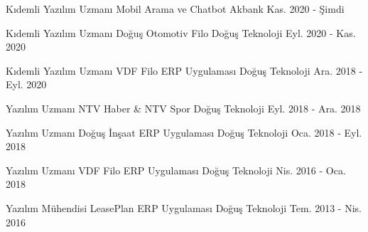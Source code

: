

\begin{cventries}

  \cventry
    {Kıdemli Yazılım Uzmanı} %
    {Mobil Arama ve Chatbot} %
    {Akbank} %
    {Kas. 2020 - Şimdi} %
    {}

  \cventry
    {Kıdemli Yazılım Uzmanı} %
    {Doğuş Otomotiv Filo} %
    {Doğuş Teknoloji} %
    {Eyl. 2020 - Kas. 2020} %
    {}

  \cventry
    {Kıdemli Yazılım Uzmanı} %
    {VDF Filo ERP Uygulaması} %
    {Doğuş Teknoloji} %
    {Ara. 2018 - Eyl. 2020} %
    {}

  \cventry
    {Yazılım Uzmanı} %
    {NTV Haber \& NTV Spor} %
    {Doğuş Teknoloji} %
    {Eyl. 2018 - Ara. 2018} %
    {}

  \cventry
    {Yazılım Uzmanı} %
    {Doğuş İnşaat ERP Uygulaması} %
    {Doğuş Teknoloji} %
    {Oca. 2018 - Eyl. 2018} %
    {}

  \cventry
    {Yazılım Uzmanı} %
    {VDF Filo ERP Uygulaması} %
    {Doğuş Teknoloji} %
    {Nis. 2016 - Oca. 2018} %
    {}

  \cventry
    {Yazılım Mühendisi} %
    {LeasePlan ERP Uygulaması} %
    {Doğuş Teknoloji} %
    {Tem. 2013 - Nis. 2016} %
    {}

\end{cventries}
